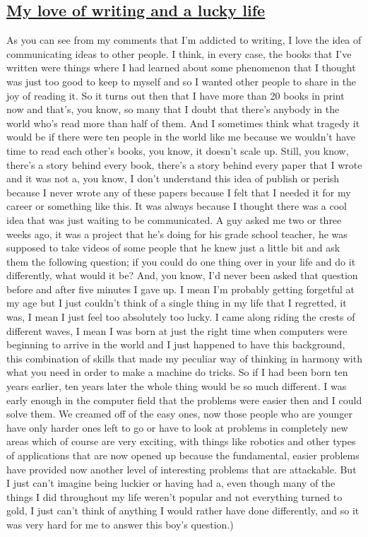 \documentclass[]{article}
\begin{document}
\subsection{\texorpdfstring{\href{http://webofstories.com/play/17143}{My
love of writing and a lucky
life}}{My love of writing and a lucky life}}\label{my-love-of-writing-and-a-lucky-life}

As you can see from my comments that I'm addicted to writing, I love the
idea of communicating ideas to other people. I think, in every case, the
books that I've written were things where I had learned about some
phenomenon that I thought was just too good to keep to myself and so I
wanted other people to share in the joy of reading it. So it turns out
then that I have more than 20 books in print now and that's, you know,
so many that I doubt that there's anybody in the world who's read more
than half of them. And I sometimes think what tragedy it would be if
there were ten people in the world like me because we wouldn't have time
to read each other's books, you know, it doesn't scale up. Still, you
know, there's a story behind every book, there's a story behind every
paper that I wrote and it was not a, you know, I don't understand this
idea of publish or perish because I never wrote any of these papers
because I felt that I needed it for my career or something like this. It
was always because I thought there was a cool idea that was just waiting
to be communicated. A guy asked me two or three weeks ago, it was a
project that he's doing for his grade school teacher, he was supposed to
take videos of some people that he knew just a little bit and ask them
the following question; if you could do one thing over in your life and
do it differently, what would it be? And, you know, I'd never been asked
that question before and after five minutes I gave up. I mean I'm
probably getting forgetful at my age but I just couldn't think of a
single thing in my life that I regretted, it was, I mean I just feel too
absolutely too lucky. I came along riding the crests of different waves,
I mean I was born at just the right time when computers were beginning
to arrive in the world and I just happened to have this background, this
combination of skills that made my peculiar way of thinking in harmony
with what you need in order to make a machine do tricks. So if I had
been born ten years earlier, ten years later the whole thing would be so
much different. I was early enough in the computer field that the
problems were easier then and I could solve them. We creamed off of the
easy ones, now those people who are younger have only harder ones left
to go or have to look at problems in completely new areas which of
course are very exciting, with things like robotics and other types of
applications that are now opened up because the fundamental, easier
problems have provided now another level of interesting problems that
are attackable. But I just can't imagine being luckier or having had a,
even though many of the things I did throughout my life weren't popular
and not everything turned to gold, I just can't think of anything I
would rather have done differently, and so it was very hard for me to
answer this boy's question.)
\end{document}

